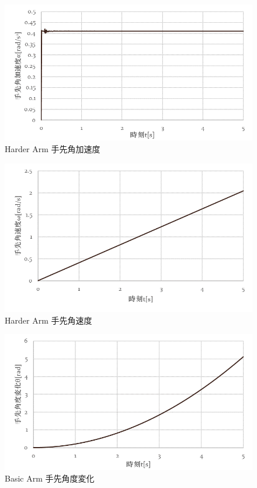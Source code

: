 \documentclass[10pt,b5paper,papersize,dvipdfmx]{jsbook}
\begin{document}
\begin{figure}[htbp]
  \centering
  \includegraphics[width=12cm]{img/robot14.png}
  \caption{Harder Arm 手先角加速度}
  \label{fig:Harder Arm 手先角加速度}
\end{figure}
\begin{figure}[htbp]
  \centering
  \includegraphics[width=12cm]{img/robot15.png}
  \caption{Harder Arm 手先角速度}
  \label{fig:Harder Arm 手先角速度}
\end{figure}
\begin{figure}[htbp]
  \centering
  \includegraphics[width=12cm]{img/robot16.png}
  \caption{Basic Arm 手先角度変化}
  \label{fig:Basic Arm 手先角度変化}
\end{figure}
\end{document}
